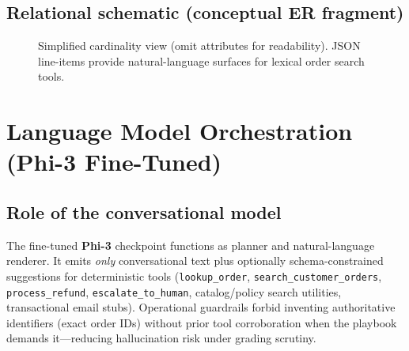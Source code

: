 \documentclass[11pt,a4paper,twoside]{report}
\begin{document}
\section{Relational schematic (conceptual ER fragment)}

\begin{figure}[htbp]
\centering
{}
\caption{Simplified cardinality view (omit attributes for readability). JSON line-items provide natural-language surfaces for lexical order search tools.}
\label{fig:er-fragment}
\end{figure}

\chapter{Language Model Orchestration (\mbox{Phi-3} Fine-Tuned)}

\section{Role of the conversational model}
The fine-tuned \textbf{Phi-3} checkpoint functions as planner and natural-language renderer.
It emits \emph{only} conversational text plus optionally schema-constrained suggestions for deterministic tools (\texttt{lookup\_order}, \texttt{search\_customer\_orders}, \texttt{process\_refund}, \texttt{escalate\_to\_human}, catalog/policy search utilities, transactional email stubs).
Operational guardrails forbid inventing authoritative identifiers (exact order IDs) without prior tool corroboration when the playbook demands it—reducing hallucination risk under grading scrutiny.
\end{document}
